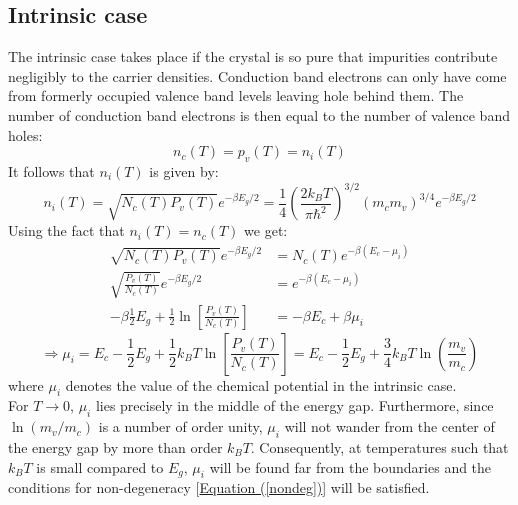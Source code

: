 \documentclass[10.75pt,a4paper,openright,bottom=2cm]{article}
\renewcommand{\refeq}[1]{\hyperref[#1]{Equation (\ref{#1})}}
\begin{document}
\subsection{Intrinsic case}
The intrinsic case takes place if the crystal is so pure that impurities contribute negligibly to the carrier densities. Conduction band electrons can only have come from formerly occupied valence band levels leaving hole behind them. The number of conduction band electrons is then equal to the number of valence band holes:
\[
n_c(T)=p_v(T)=n_i(T)
\]
It follows that $n_i(T)$ is given by:
\[
n_i(T)=\sqrt{N_c(T)P_v(T)}e^{-\beta E_g/2}=\frac{1}{4}\left(\frac{2k_BT}{\pi\hbar^2}\right)^{3/2}(m_cm_v)^{3/4}e^{-\beta E_g/2}
\]
Using the fact that $n_i(T)=n_c(T)$ we get:
\[
\begin{aligned}
\sqrt{N_c(T)P_v(T)}e^{-\beta E_g/2}&=N_c(T)e^{-\beta(E_c-\mu_i)}\\
\sqrt{\frac{P_v(T)}{N_c(T)}}e^{-\beta E_g/2}&=e^{-\beta(E_c-\mu_i)}\\
-\beta \frac{1}{2}E_g+\frac{1}{2}\ln\left[\frac{P_v(T)}{N_c(T)}\right]&=-\beta E_c+\beta\mu_i
\end{aligned}
\]
\[
\Rightarrow\mu_i=E_c-\frac{1}{2}E_g+\frac{1}{2}k_BT\ln\left[\frac{P_v(T)}{N_c(T)}\right]=E_c-\frac{1}{2}E_g+\frac{3}{4}k_BT\ln\left(\frac{m_v}{m_c}\right)
\]
where $\mu_i$ denotes the value of the chemical potential in the intrinsic case.\\
For $T\to0$, $\mu_i$ lies precisely in the middle of the energy gap. Furthermore, since $\ln(m_v/m_c)$ is a number of order unity, $\mu_i$ will not wander from the center of the energy gap by more than order $k_BT$. Consequently, at temperatures such that $k_BT$ is small compared to $E_g$, $\mu_i$ will be found far from the boundaries and the conditions for non-degeneracy [\refeq{nondeg}] will be satisfied.
\end{document}
